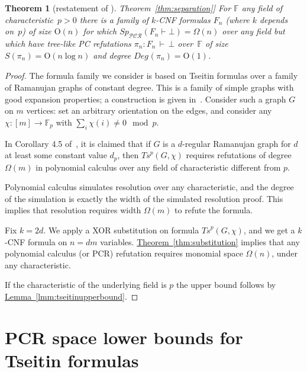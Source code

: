 \documentclass[11pt]{article}
\numberwithin{equation}{section}
\newtheorem{theorem}{Theorem}[section]
\theoremstyle{definition}
\theoremstyle{plain}
\newcommand{\expref}[2]{\hyperref[#2]{#1~\ref{#2}}}
\theoremstyle{plain}
\theoremstyle{definition}
\newcommand{\bigoh}[1]{\mathrm{O} ( #1 )}
\newcommand{\bigomega}[1]{\Omega ( #1 )}
\newcommand{\fieldstd}{\mathbb{F}}
\newcommand{\funcdescr}[3]{\ensuremath{ #1 : #2 \to #3}}
\newcommand{\proofsystemsubindexformat}[1]{\scriptscriptstyle{\mathcal{#1}}}
\newcommand{\pcrnot}{\proofsystemsubindexformat{PCR}}
\newcommand{\proofstd}{\pi}
\newcommand{\derives}{\vdash}
\newcommand{\derivof}[4][\derives]
        {{\ensuremath{{#2} : {#3} \, {#1}\, {#4}}}}
\newcommand{\refof}[2]{\derivof{#1}{#2}{\bot}}
\newcommand{\formf}{\ensuremath{F}}
\newcommand{\derivabbrevsmall}[2]{( #1 \vdash #2 )}
\newcommand{\refutabbrevsmall}[1]{\derivabbrevsmall{#1}{\!\bot}}
\newcommand{\genericformsmall}[2]{\mathit{#1}( #2 )}
\newcommand{\genericrefsmall}[3]{{\mathit{#1}}_{#2}\refutabbrevsmall{#3}}
\newcommand{\sizeofarg}[1]{\genericformsmall{S}{#1}}
\newcommand{\mspaceref}[2][]{\genericrefsmall{Sp}{#1}{#2}}
\newcommand{\mdegreeof}[2][]{\genericformsmall{Deg_{#1}}{#2}}
\newcommand{\formulaformat}[1]{\mathit{#1}}
\newcommand{\fstd}{\formf}
\newcommand{\formulakwidth}{k}
\newcommand{\fkwidth}{\formulakwidth}
\newcommand{\tseitinmodpnot}[2]{\formulaformat{Ts}^{p}({#1,#2})}
\newcommand{\tseitincharge}{\chi}
\begin{document}
\begin{theorem}[restatement of \expref{Theorem}{thm:separation}]
  For $\fieldstd$ any field of characteristic~$p>0$
  there is a family of
  \mbox{$\fkwidth$-CNF} formulas
  $F_n$
  (where $\fkwidth$ depends on~$p$)
  of size $\bigoh{n}$
  for which
%
  $\mspaceref[\pcrnot]{F_{n}}=\bigomega{n}$
  over any field
  but  which have tree-like PC refutations
  $\refof{\proofstd_n}{\fstd_n}$ 
  over~$\fieldstd$
  of size
  $\sizeofarg{\proofstd_n}=\bigoh{n\log n}$
  and degree
  $\mdegreeof{\proofstd_n}=\bigoh{1}$.
\end{theorem}
\begin{proof}
  The formula family we consider is based on Tseitin formulas over a
  family of Ramanujan graphs of constant degree. This is a family of
  simple graphs with good expansion properties; a construction is
  given in~\cite{Morgenstern1994}.  Consider such a graph $G$ on $m$
  vertices: set an arbitrary orientation on the edges, and consider
  any $\funcdescr{\tseitincharge}{[m]}{\fieldstd_p}$ with
  $\sum_{i}\tseitincharge(i)\not=0 \mod{p}$.
  
  In Corollary 4.5 of~\cite{AR03LowerBounds}, it is claimed that if
  $G$ is a $d$-regular Ramanujan graph for $d$ at least some constant value
  $d_{p}$, then $\tseitinmodpnot{G}{\tseitincharge}$ requires
  refutations of degree $\bigomega{m}$ in polynomial calculus over any
  field of characteristic different from $p$.

  Polynomial calculus simulates resolution over any characteristic,
  and the degree of the simulation is exactly the width of the
  simulated resolution proof. This implies that resolution requires
  width $\bigomega{m}$ to refute the formula.

  Fix $k=2d$. We apply a XOR substitution on formula
  $\tseitinmodpnot{G}{\tseitincharge}$, and 
  we get a $\fkwidth$-CNF formula on $n=dm$
  variables. \expref{Theorem}{thm:substitution} implies that any polynomial calculus (or PCR) refutation requires monomial space $\bigomega{n}$, under
  any characteristic.

  If the characteristic of the underlying field is $p$ the upper bound
  follows by \expref{Lemma}{lmm:tseitinupperbound}.
\end{proof}

%
%
%
\section{PCR space lower bounds for Tseitin formulas}
\label{sec:small-cycles}
\end{document}
